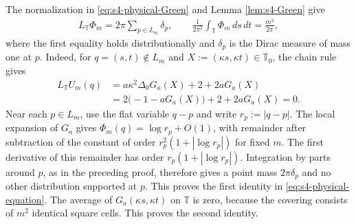 \documentclass[a4paper,11pt,oneside,reqno]{amsart}
\numberwithin{equation}{section}
\theoremstyle{definition}
\begin{document}
The normalization in \eqref{eq:s4-physical-Green} and Lemma \ref{lem:s4-Green} give
%
\begin{align}
    \label{eq:s4-physical-equation}
    L_{\mathbb T}\Phi_m=2\pi\sum_{p\in L_m}\delta_p,
    \qquad
    \frac1{2\pi^2}\int_{\mathbb T}\Phi_m\,ds\,dt
    =\frac{m^2}{2\pi},
\end{align}
%
where the first equality holds distributionally and
$\delta_p$ is the Dirac measure of mass one at $p$.
Indeed, for $q=(s,t)\notin L_m$ and
$X:=(\kappa s,\kappa t)\in\mathbb T_0$, the chain rule gives
%
\begin{align*}
    L_{\mathbb T}U_m(q)
    &=a\kappa^2\Delta_0G_a(X)+2+2aG_a(X)\\
    &=2\bigl(-1-aG_a(X)\bigr)+2+2aG_a(X)=0.
\end{align*}
%
Near each $p\in L_m$, use the flat variable $q-p$ and
write $r_p:=|q-p|$. The local expansion of $G_a$ gives
$\Phi_m(q)=\log r_p+O(1)$, with remainder after subtraction
of the constant of order $r_p^2(1+|\log r_p|)$ for fixed $m$.
The first derivative of this remainder has order
$r_p(1+|\log r_p|)$. Integration by parts around $p$,
as in the preceding proof, therefore gives a point mass
$2\pi\delta_p$ and no other distribution supported at $p$.
This proves the first identity in
\eqref{eq:s4-physical-equation}. The average of
$G_a(\kappa s,\kappa t)$ on $\mathbb T$ is zero, because
the covering consists of $m^2$ identical square cells.
This proves the second identity.
\end{document}
